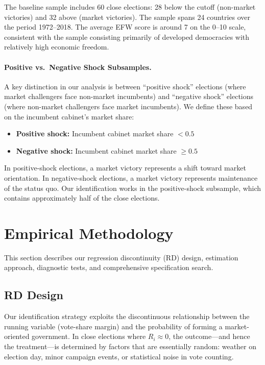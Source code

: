 \documentclass[12pt,a4paper]{article}
\begin{document}
The baseline sample includes 60 close elections: 28 below the cutoff 
(non-market victories) and 32 above (market victories). The sample spans 
24 countries over the period 1972--2018. The average EFW score is around 
7 on the 0--10 scale, consistent with the sample consisting primarily of 
developed democracies with relatively high economic freedom.

\paragraph{Positive vs.\ Negative Shock Subsamples.}
A key distinction in our analysis is between ``positive shock'' elections 
(where market challengers face non-market incumbents) and ``negative shock'' 
elections (where non-market challengers face market incumbents). We define 
these based on the incumbent cabinet's market share:
\begin{itemize}[noitemsep]
    \item \textbf{Positive shock:} Incumbent cabinet market share $< 0.5$
    \item \textbf{Negative shock:} Incumbent cabinet market share $\geq 0.5$
\end{itemize}

In positive-shock elections, a market victory represents a shift toward 
market orientation. In negative-shock elections, a market victory 
represents maintenance of the status quo. Our identification works in 
the positive-shock subsample, which contains approximately half of the 
close elections.


\section{Empirical Methodology}
\label{sec:methodology}

This section describes our regression discontinuity (RD) design, 
estimation approach, diagnostic tests, and comprehensive specification 
search.

\subsection{RD Design}

Our identification strategy exploits the discontinuous relationship 
between the running variable (vote-share margin) and the probability 
of forming a market-oriented government. In close elections where 
$R_i \approx 0$, the outcome---and hence the treatment---is determined 
by factors that are essentially random: weather on election day, minor 
campaign events, or statistical noise in vote counting.
\end{document}
